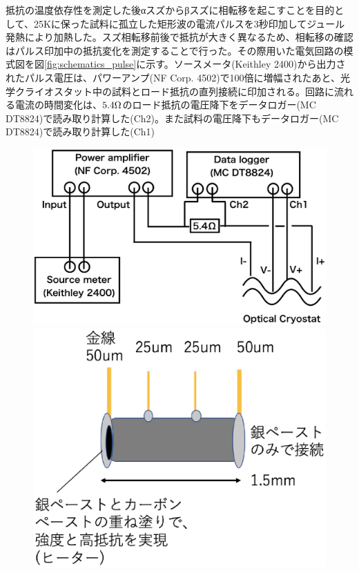 抵抗の温度依存性を測定した後αスズからβスズに相転移を起こすことを目的として、25Kに保った試料に孤立した矩形波の電流パルスを3秒印加してジュール発熱により加熱した。スズ相転移前後で抵抗が大きく異なるため、相転移の確認はパルス印加中の抵抗変化を測定することで行った。その際用いた電気回路の模式図を図\ref{fig:schematics_pulse}に示す。ソースメータ(Keithley 2400)から出力されたパルス電圧は、パワーアンプ(NF Corp. 4502)で100倍に増幅されたあと、光学クライオスタット中の試料とロード抵抗の直列接続に印加される。回路に流れる電流の時間変化は、$\rm 5.4\Omega$のロード抵抗の電圧降下をデータロガー(MC DT8824)で読み取り計算した(Ch2)。また試料の電圧降下もデータロガー(MC DT8824)で読み取り計算した(Ch1)
\begin{figure}[!h]
 \begin{minipage}{0.5\hsize}
    \begin{center}
   \includegraphics[width=\hsize]{experiment/schematics_pulse.eps}
  \end{center}
  \caption{}
  \label{fig:schematics_pulse}
   \end{minipage}
    \begin{minipage}{0.4\hsize}
       \begin{center}
   \includegraphics[width=\hsize]{experiment/schematics_sample.eps}
  \end{center}
  \caption{}
  \label{fig:schematics_sample}
    \end{minipage}
  \end{figure}
  
